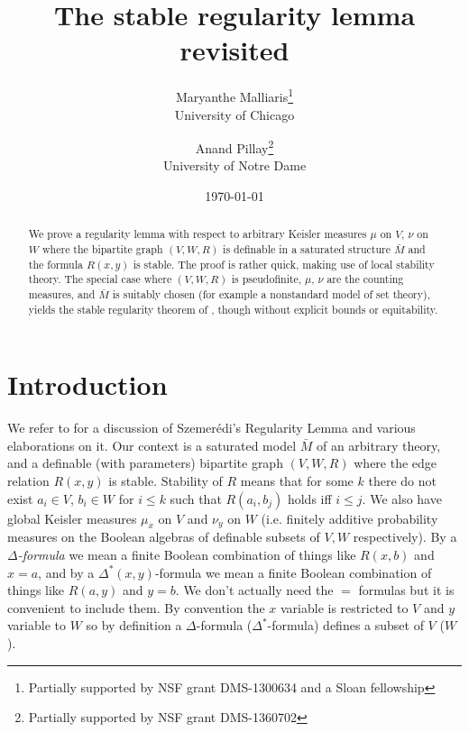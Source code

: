 \documentclass[12pt]{article}
\title{The stable regularity lemma revisited}
\date{\today}
\author{Maryanthe Malliaris\thanks{Partially supported by NSF grant DMS-1300634 and a Sloan fellowship  }\\University of Chicago \and Anand Pillay\thanks{Partially supported by NSF grant DMS-1360702}\\University of Notre Dame}
\begin{document}
\maketitle

\begin{abstract} We prove a regularity lemma  with respect to  arbitrary Keisler measures $\mu$ on $V$, $\nu$ on $W$ where the bipartite graph $(V,W,R)$ is definable in a saturated structure ${\bar M}$ and the formula $R(x,y)$ is stable.  The proof is rather quick, making use of  local stability theory. The special case where $(V,W,R)$ is pseudofinite, $\mu$, $\nu$ are the counting measures, and ${\bar M}$ is suitably chosen (for example a nonstandard model of set theory), yields the stable regularity theorem of  \cite{MS}, though without explicit bounds or equitability. 
\end{abstract}

\section{Introduction}
We refer to \cite{MS} for a discussion of Szemer\'edi's Regularity Lemma and various elaborations on it. 
Our context  is a saturated model ${\bar M}$ of an arbitrary theory,   and a definable (with parameters) bipartite graph $(V,W,R)$ where the edge relation $R(x,y)$ is  stable. Stability of $R$ means that for some $k$ there do not exist $a_{i}\in V$, $b_{i}\in W$ for $i\leq k$ such that $R(a_{i},b_{j})$ holds iff $i\leq j$.  We also have global Keisler measures $\mu_{x}$ on $V$ and $\nu_{y}$ on $W$ (i.e. finitely additive probability measures on the Boolean algebras of definable subsets of $V,W$ respectively).  
By a {\em $\Delta$-formula} we mean a finite Boolean combination of things like $R(x,b)$ and $x=a$, and by a $\Delta^{*}(x,y)$-formula we mean a finite Boolean combination of things like $R(a,y)$ and $y = b$.  We don't actually need the $=$ formulas but it is convenient to include them. By convention the $x$ variable is restricted to $V$ and $y$ variable to $W$ so by definition a $\Delta$-formula ($\Delta^{*}$-formula)  defines a subset of $V$ ($W$).  
\end{document}

